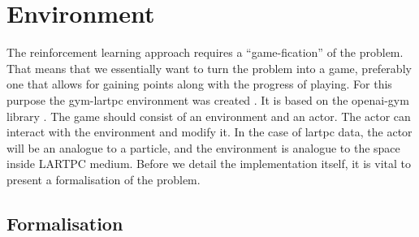 






\section{Environment}

The reinforcement learning approach requires a ``game-fication'' of the problem.
That means that we essentially want to turn the problem into a game, preferably one that allows for gaining points along with the progress of playing.
For this purpose the gym-lartpc environment was created \cite{gymlartpc}.
It is based on the openai-gym library \cite{openaigym}.
The game should consist of an environment and an actor.
The actor can interact with the environment and modify it.
In the case of lartpc data, the actor will be an analogue to a particle, and the environment is analogue to the space inside LARTPC medium.
Before we detail the implementation itself, it is vital to present a formalisation of the problem.

\subsection{Formalisation}

